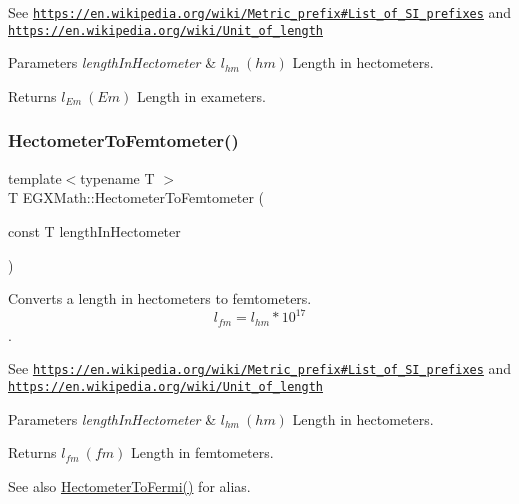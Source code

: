See \href{https://en.wikipedia.org/wiki/Metric_prefix#List_of_SI_prefixes}{\tt https\+://en.\+wikipedia.\+org/wiki/\+Metric\+\_\+prefix\#\+List\+\_\+of\+\_\+\+S\+I\+\_\+prefixes} and \href{https://en.wikipedia.org/wiki/Unit_of_length}{\tt https\+://en.\+wikipedia.\+org/wiki/\+Unit\+\_\+of\+\_\+length} 
\begin{DoxyParams}{Parameters}
{\em length\+In\+Hectometer} & $ l_{hm}\ (hm)$ Length in hectometers. \\
\hline
\end{DoxyParams}
\begin{DoxyReturn}{Returns}
$ l_{Em}\ (Em)$ Length in exameters. 
\end{DoxyReturn}
\mbox{\label{group___e_g_x_math-_conversions-_length_conversions-_hectometer-_s_i_gac1a1dfa64b70f5495ef5ea5c85b17677}} 
\subsubsection{\texorpdfstring{Hectometer\+To\+Femtometer()}{HectometerToFemtometer()}}
{\footnotesize\ttfamily template$<$typename T $>$ \\
T E\+G\+X\+Math\+::\+Hectometer\+To\+Femtometer (\begin{DoxyParamCaption}\item[{const T}]{length\+In\+Hectometer }\end{DoxyParamCaption})}



Converts a length in hectometers to femtometers. \[ l_{fm}=l_{hm} * 10^{17} \]. 

See \href{https://en.wikipedia.org/wiki/Metric_prefix#List_of_SI_prefixes}{\tt https\+://en.\+wikipedia.\+org/wiki/\+Metric\+\_\+prefix\#\+List\+\_\+of\+\_\+\+S\+I\+\_\+prefixes} and \href{https://en.wikipedia.org/wiki/Unit_of_length}{\tt https\+://en.\+wikipedia.\+org/wiki/\+Unit\+\_\+of\+\_\+length} 
\begin{DoxyParams}{Parameters}
{\em length\+In\+Hectometer} & $ l_{hm}\ (hm)$ Length in hectometers. \\
\hline
\end{DoxyParams}
\begin{DoxyReturn}{Returns}
$ l_{fm}\ (fm)$ Length in femtometers. 
\end{DoxyReturn}
\begin{DoxySeeAlso}{See also}
\mbox{\hyperlink{group___e_g_x_math-_conversions-_length_conversions-_hectometer-_non-_s_i_gabd26977f3d5ad9d0560afb10be63a598}{Hectometer\+To\+Fermi()}} for alias. 
\end{DoxySeeAlso}
\mbox{\label{group___e_g_x_math-_conversions-_length_conversions-_hectometer-_s_i_ga506846099a8b61bcc3d1cf761dc4cfc5}} 

